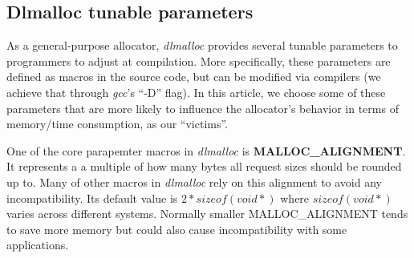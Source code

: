 \begin{table*}[htbp]
\centering
\caption{\emph{dlmalloc} parameters}
\label{tab_dlmalloc_parameters}
\end{table*}


\subsection{Dlmalloc tunable parameters}
As a general-purpose allocator, \emph{dlmalloc} provides several tunable parameters to programmers to adjust at compilation. More specifically, these parameters are defined as macros in the source code, but can be modified via compilers (we achieve that through \emph{gcc}'s ``-D'' flag). In this article, we choose some of these parameters that are more likely to influence the allocator's behavior in terms of memory/time consumption, as our ``victims''. 

One of the core parapemter macros in \emph{dlmalloc}  is \textbf{MALLOC\_ALIGNMENT}. It represents a a multiple of how many bytes all request sizes should be rounded up to. Many of other macros in \emph{dlmalloc} rely on this alignment to avoid any incompatibility. Its default value is $2*sizeof(void*)$ where $sizeof(void*)$ varies across different systems. Normally smaller MALLOC\_ALIGNMENT tends to save more memory but could also cause incompatibility with some applications. 


